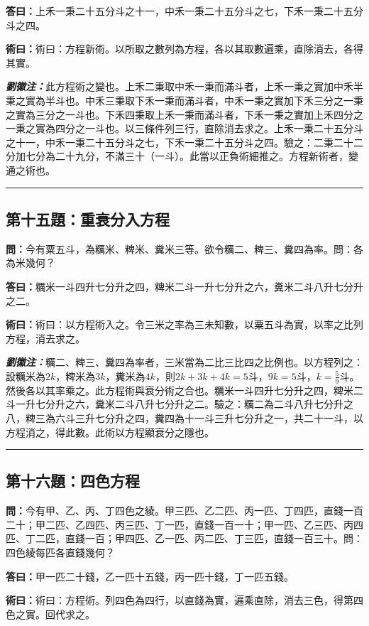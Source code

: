 \documentclass[11pt,a4paper]{article}
\newcommand{\wen}[1]{\textbf{\color{problemcolor}問：}#1\par}
\newcommand{\da}[1]{\textbf{答曰：}#1\par}
\newcommand{\shu}[1]{\textbf{術曰：}#1\par}
\newcommand{\liuhui}[1]{{\color{commentarycolor}\textit{\textbf{劉徽注：}}#1\par}}
\begin{document}
\da{上禾一秉二十五分斗之十一，中禾一秉二十五分斗之七，下禾一秉二十五分斗之四。}

\shu{術曰：方程新術。以所取之數列為方程，各以其取數遍乘，直除消去，各得其實。}

\liuhui{此方程術之變也。上禾二秉取中禾一秉而滿斗者，上禾一秉之實加中禾半秉之實為半斗也。中禾三秉取下禾一秉而滿斗者，中禾一秉之實加下禾三分之一秉之實為三分之一斗也。下禾四秉取上禾一秉而滿斗者，下禾一秉之實加上禾四分之一秉之實為四分之一斗也。以三條件列三行，直除消去求之。上禾一秉二十五分斗之十一，中禾一秉二十五分斗之七，下禾一秉二十五分斗之四。驗之：二秉二十二分加七分為二十九分，不滿三十（一斗）。此當以正負術細推之。方程新術者，變通之術也。}

\bigskip
\hrule
\bigskip

\subsection{第十五題：重衰分入方程}

\wen{今有粟五斗，為糲米、粺米、糞米三等。欲令糲二、粺三、糞四為率。問：各為米幾何？}

\da{糲米一斗四升七分升之四，粺米二斗一升七分升之六，糞米二斗八升七分升之二。}

\shu{術曰：以方程術入之。令三米之率為三未知數，以粟五斗為實，以率之比列方程，消去求之。}

\liuhui{糲二、粺三、糞四為率者，三米當為二比三比四之比例也。以方程列之：設糲米為$2k$，粺米為$3k$，糞米為$4k$，則$2k + 3k + 4k = 5$斗，$9k = 5$斗，$k = \frac{5}{9}$斗。然後各以其率乘之。此方程術與衰分術之合也。糲米一斗四升七分升之四，粺米二斗一升七分升之六，糞米二斗八升七分升之二。驗之：糲二為二斗八升七分升之八，粺三為六斗三升七分升之四，糞四為十一斗三升七分升之一，共二十一斗，以方程消之，得此數。此術以方程顯衰分之隱也。}

\bigskip
\hrule
\bigskip

\subsection{第十六題：四色方程}

\wen{今有甲、乙、丙、丁四色之綾。甲三匹、乙二匹、丙一匹、丁四匹，直錢一百二十；甲二匹、乙四匹、丙三匹、丁一匹，直錢一百一十；甲一匹、乙三匹、丙四匹、丁二匹，直錢一百；甲四匹、乙一匹、丙二匹、丁三匹，直錢一百三十。問：四色綾每匹各直錢幾何？}

\da{甲一匹二十錢，乙一匹十五錢，丙一匹十錢，丁一匹五錢。}

\shu{術曰：方程術。列四色為四行，以直錢為實，遍乘直除，消去三色，得第四色之實。回代求之。}
\end{document}

